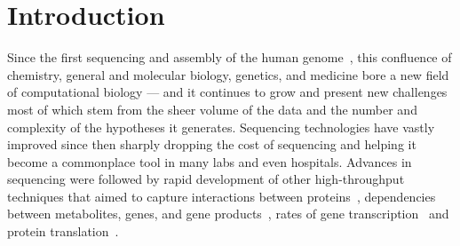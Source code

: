 \documentclass[12pt]{cmuthesis}
\begin{document}
\tableofcontents
\listoffigures
\listoftables

\mainmatter


%
%
%
%
%



\chapter{Introduction}


Since the first sequencing and assembly of the human genome~\cite{FirstHumanGenome}, this confluence of chemistry, general and molecular biology, genetics, and medicine bore a new field of computational biology --- and it continues to grow and present new challenges most of which stem from the sheer volume of the data and the number and complexity of the hypotheses it generates. Sequencing technologies have vastly improved since then sharply dropping the cost of sequencing and helping it become a commonplace tool in many labs and even hospitals. Advances in sequencing were followed by rapid development of other high-throughput techniques that aimed to capture interactions between proteins~\cite{yeast2hybrid,TAPMS}, dependencies between metabolites, genes, and gene products~\cite{ChipSeq,GeneKnockouts}, rates of gene transcription~\cite{RNAseq} and protein translation~\cite{riboseq}.
\end{document}
